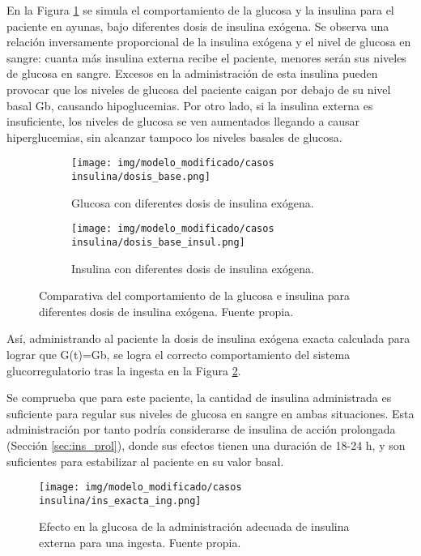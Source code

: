 En la Figura \ref{fig:dosis_ins} se simula el comportamiento de la glucosa y la insulina para el paciente en ayunas, bajo diferentes dosis de insulina exógena. Se observa una relación inversamente proporcional de la insulina exógena y el nivel de glucosa en sangre: cuanta más insulina externa recibe el paciente, menores serán sus niveles de glucosa en sangre. Excesos en la administración de esta insulina pueden provocar que los niveles de glucosa del paciente caigan por debajo de su nivel basal Gb, causando hipoglucemias. Por otro lado, si la insulina externa es insuficiente, los niveles de glucosa se ven aumentados llegando a causar hiperglucemias, sin alcanzar tampoco los niveles basales de glucosa. 
\clearpage
\begin{figure}[htbp]
    \centering
    \begin{subfigure}[b]{0.9\linewidth} %
        \centering
        \texttt{[image: img/modelo\_modificado/casos insulina/dosis\_base.png]}
        \caption{Glucosa con diferentes dosis de insulina exógena.}
    \end{subfigure}
    
    \vspace{0.5cm} %

    \begin{subfigure}[b]{0.9\linewidth} %
        \centering
        \texttt{[image: img/modelo\_modificado/casos insulina/dosis\_base\_insul.png]}
        \caption{Insulina con diferentes dosis de insulina exógena.}
    \end{subfigure}
    
    \caption{Comparativa del comportamiento de la glucosa e insulina para diferentes dosis de insulina exógena. Fuente propia.}
    \label{fig:dosis_ins}
\end{figure}


Así, administrando al paciente la dosis de insulina exógena exacta calculada para lograr que G(t)=Gb, se logra el correcto comportamiento del sistema glucorregulatorio tras la ingesta en la Figura \ref{fig:ins_ex_ing}.

Se comprueba que para este paciente, la cantidad de insulina administrada es suficiente para regular sus niveles de glucosa en sangre en ambas situaciones. Esta administración por tanto podría considerarse de insulina de acción prolongada (Sección \ref{sec:ins_prol}), donde sus efectos tienen una duración de 18-24 h, y son suficientes para estabilizar al paciente en su valor basal.
\clearpage
\begin{figure}[htbp]
    \centering
    \texttt{[image: img/modelo\_modificado/casos insulina/ins\_exacta\_ing.png]}
    \caption{Efecto en la glucosa de la administración adecuada de insulina externa para una ingesta. Fuente propia.}
    \label{fig:ins_ex_ing}
\end{figure}


